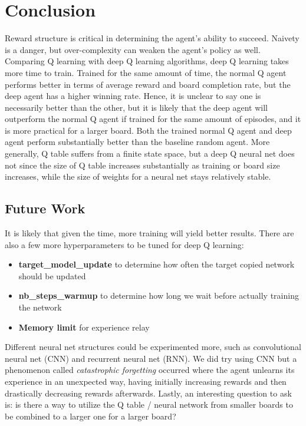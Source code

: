 \section{Conclusion}

Reward structure is critical in determining the agent’s ability to succeed. Naivety is a danger, but over-complexity can weaken the agent’s policy as well. Comparing Q learning with deep Q learning algorithms, deep Q learning takes more time to train. Trained for the same amount of time, the normal Q agent performs better in terms of average reward and board completion rate, but the deep agent has a higher winning rate. Hence, it is unclear to say one is necessarily better than the other, but it is likely that the deep agent will outperform the normal Q agent if trained for the same amount of episodes, and it is more practical for a larger board. Both the trained normal Q agent and deep agent perform substantially better than the baseline random agent. More generally, Q table suffers from a finite state space, but a deep Q neural net does not since the size of Q table increases substantially as training or board size increases, while the size of weights for a neural net stays relatively stable. 

\subsection{Future Work}

It is likely that given the time, more training will yield better results. There are also a few more hyperparameters to be tuned for deep Q learning:

\begin{itemize}
\item \textbf{target\_model\_update} to determine how often the target copied network should be updated
\item \textbf{nb\_steps\_warmup} to determine how long we wait before actually training the network
\item \textbf{Memory limit} for experience relay
\end{itemize}

Different neural net structures could be experimented more, such as convolutional neural net (CNN) and recurrent neural net (RNN). We did try using CNN but a phenomenon called \emph{catastrophic forgetting} occurred where the agent unlearns its experience in an unexpected way, having initially increasing rewards and then drastically decreasing rewards afterwards. Lastly, an interesting question to ask is: is there a way to utilize the Q table / neural network from smaller boards to be combined to a larger one for a larger board?
